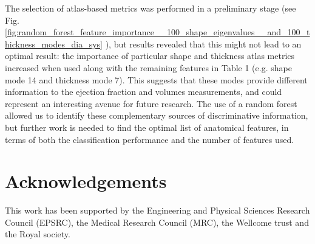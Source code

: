\documentclass{llncs}
\begin{document}
The selection of atlas-based metrics was performed in a preliminary stage (see Fig. \ref{fig:random_forest_feature_importance__100_shape_eigenvalues__and_100_thickness_modes_dia_sys} ), but results revealed that this might not lead to an optimal result: the importance of particular shape and thickness atlas metrics increased when used along with the remaining features in Table 1 (e.g. shape mode 14 and thickness mode 7). This suggests that these modes provide different information to the ejection fraction and volumes measurements, and could represent an interesting avenue for future research. The use of a random forest allowed us to identify these complementary sources of discriminative information, but further work is needed to find the optimal list of anatomical features, in terms of both the classification performance and the number of features used.


\section{Acknowledgements}
This work has been supported by the Engineering and Physical Sciences Research Council (EPSRC), the Medical Research Council (MRC), the Wellcome trust and the Royal society.


\end{document}
